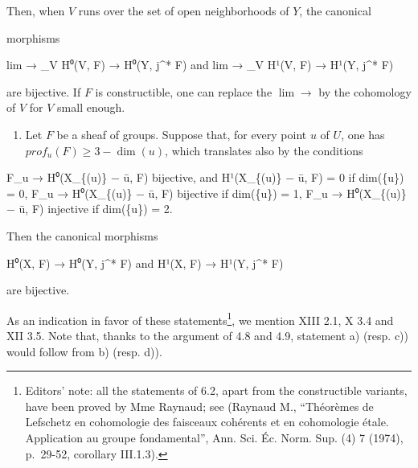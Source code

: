\documentclass[
]{article}
\newenvironment{Shaded}{}{}
\newcommand{\NormalTok}[1]{#1}
\providecommand{\tightlist}{%
  \setlength{\itemsep}{0pt}\setlength{\parskip}{0pt}}
\begin{document}
Then, when \(V\) runs over the set of open neighborhoods of \(Y\), the
canonical

morphisms

\begin{Shaded}
\begin{Highlighting}[]
\NormalTok{lim → \_V H⁰(V, F) → H⁰(Y, j\^{}* F)  and  lim → \_V H¹(V, F) → H¹(Y, j\^{}* F)}
\end{Highlighting}
\end{Shaded}

are bijective. If \(F\) is constructible, one can replace the
\(\lim \to\) by the cohomology of \(V\) for \(V\) small enough.

\begin{enumerate}
\def\labelenumi{\alph{enumi})}
\setcounter{enumi}{3}
\tightlist
\item
  Let \(F\) be a sheaf of groups. Suppose that, for every point \(u\) of
  \(U\), one has \(prof_{u}(F) \geqslant 3 - \dim({u})\), which
  translates also by the conditions
\end{enumerate}

\begin{Shaded}
\begin{Highlighting}[]
\NormalTok{F\_u → H⁰(X\_\{(u)\} − ū, F) bijective, and H¹(X\_\{(u)\} − ū, F) = 0 if dim(\{u\}) = 0,}
\NormalTok{F\_u → H⁰(X\_\{(u)\} − ū, F) bijective if dim(\{u\}) = 1,}
\NormalTok{F\_u → H⁰(X\_\{(u)\} − ū, F) injective if dim(\{u\}) = 2.}
\end{Highlighting}
\end{Shaded}

Then the canonical morphisms

\begin{Shaded}
\begin{Highlighting}[]
\NormalTok{H⁰(X, F) → H⁰(Y, j\^{}* F)  and  H¹(X, F) → H¹(Y, j\^{}* F)}
\end{Highlighting}
\end{Shaded}

are bijective.

As an indication in favor of these statements\footnote{Editors' note:
  all the statements of 6.2, apart from the constructible variants, have
  been proved by Mme Raynaud; see (Raynaud M., ``Théorèmes de Lefschetz
  en cohomologie des faisceaux cohérents et en cohomologie étale.
  Application au groupe fondamental'', Ann. Sci. Éc. Norm. Sup. (4) 7
  (1974), p.~29-52, corollary III.1.3).}, we mention XIII 2.1, X 3.4 and
XII 3.5. Note that, thanks to the argument of 4.8 and 4.9, statement a)
(resp. c)) would follow from b) (resp. d)).
\end{document}
